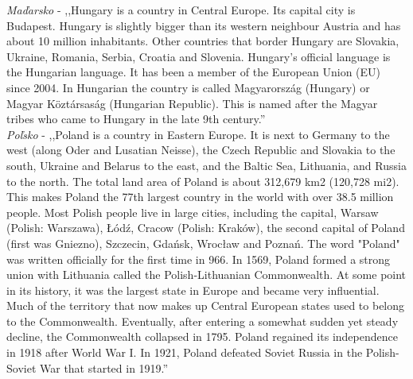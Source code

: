 \noindent
\textit{Maďarsko} - ,,Hungary is a country in Central Europe. Its capital city is Budapest. Hungary is slightly bigger than its western neighbour Austria and has about 10 million inhabitants. Other countries that border Hungary are Slovakia, Ukraine, Romania, Serbia, Croatia and Slovenia. Hungary's official language is the Hungarian language. It has been a member of the European Union (EU) since 2004. In Hungarian the country is called Magyarország (Hungary) or Magyar Köztársaság (Hungarian Republic). This is named after the Magyar tribes who came to Hungary in the late 9th century.'' \\

\noindent
\textit{Poľsko} - ,,Poland is a country in Eastern Europe. It is next to Germany to the west (along Oder and Lusatian Neisse), the Czech Republic and Slovakia to the south, Ukraine and Belarus to the east, and the Baltic Sea, Lithuania, and Russia to the north. The total land area of Poland is about 312,679 km2 (120,728 mi2). This makes Poland the 77th largest country in the world with over 38.5 million people. Most Polish people live in large cities, including the capital, Warsaw (Polish: Warszawa), Łódź, Cracow (Polish: Kraków), the second capital of Poland (first was Gniezno), Szczecin, Gdańsk, Wrocław and Poznań. The word "Poland" was written officially for the first time in 966. In 1569, Poland formed a strong union with Lithuania called the Polish-Lithuanian Commonwealth. At some point in its history, it was the largest state in Europe and became very influential. Much of the territory that now makes up Central European states used to belong to the Commonwealth. Eventually, after entering a somewhat sudden yet steady decline, the Commonwealth collapsed in 1795. Poland regained its independence in 1918 after World War I. In 1921, Poland defeated Soviet Russia in the Polish-Soviet War that started in 1919.'' \\

